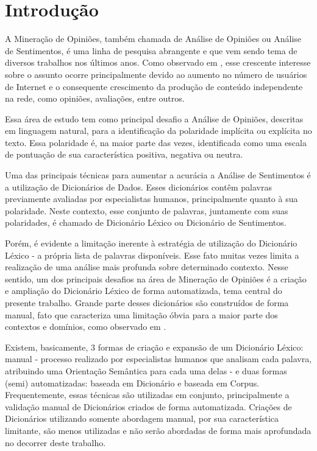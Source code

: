 \documentclass[12pt]{article}
\begin{document}
\section{Introdução}
A Mineração de Opiniões, também chamada de Análise de Opiniões ou Análise de Sentimentos, é uma linha de pesquisa abrangente e que vem sendo tema de diversos trabalhos nos últimos anos. Como observado em \cite{liu2010multifaceted}, esse crescente interesse sobre o assunto ocorre principalmente devido ao aumento no número de usuários de Internet e o consequente crescimento da produção de conteúdo independente na rede, como opiniões, avaliações, entre outros. 

Essa área de estudo tem como principal desafio a Análise de Opiniões, descritas em linguagem natural, para a identificação da polaridade implícita ou explícita no texto. Essa polaridade é, na maior parte das vezes, identificada como uma escala de pontuação de sua característica positiva, negativa ou neutra.

Uma das principais técnicas para aumentar a acurácia a Análise de Sentimentos é a utilização de Dicionários de Dados. Esses dicionários contêm palavras previamente avaliadas por especialistas humanos, principalmente quanto à sua polaridade. Neste contexto, esse conjunto de palavras, juntamente com suas polaridades, é chamado de Dicionário Léxico ou Dicionário de Sentimentos. 

Porém, é evidente a limitação inerente à estratégia de utilização do Dicionário Léxico - a própria lista de palavras disponíveis. Esse fato muitas vezes limita a realização de uma análise mais profunda sobre determinado contexto. Nesse sentido, um dos principais desafios na área de Mineração de Opiniões é a criação e ampliação do Dicionário Léxico de forma automatizada, tema central do presente trabalho. Grande parte desses dicionários são construídos de forma manual, fato que caracteriza uma limitação óbvia para a maior parte dos contextos e domínios, como observado em \cite{duwairi2015detecting}. 

Existem, basicamente, 3 formas de criação e expansão de um Dicionário Léxico: manual -  processo realizado por especialistas humanos que analisam cada palavra, atribuindo uma Orientação Semântica para cada uma delas -  e duas formas (semi) automatizadas: baseada em Dicionário e baseada em Corpus. Frequentemente, essas técnicas são utilizadas em conjunto, principalmente a validação manual de Dicionários criados de forma automatizada. Criações de Dicionários utilizando somente abordagem manual, por sua característica limitante, são menos utilizadas e não serão abordadas de forma mais aprofundada no decorrer deste trabalho.
\end{document}
